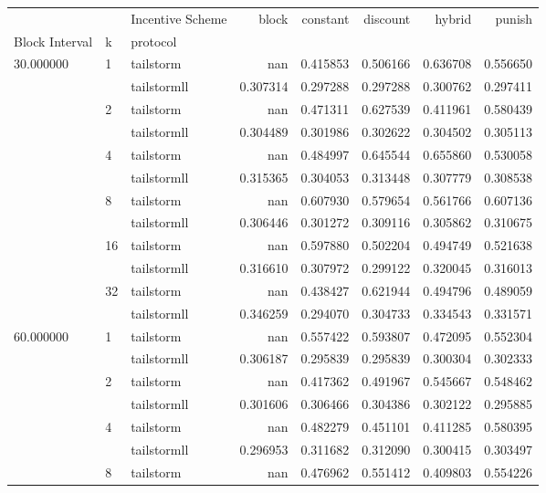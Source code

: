 \begin{tabular}{lllrrrrr}
 &  & Incentive Scheme & block & constant & discount & hybrid & punish \\
Block Interval & k & protocol &  &  &  &  &  \\
\multirow[c]{12}{*}{30.000000} & \multirow[c]{2}{*}{1} & tailstorm & nan & 0.415853 & 0.506166 & 0.636708 & 0.556650 \\
 &  & tailstormll & 0.307314 & 0.297288 & 0.297288 & 0.300762 & 0.297411 \\
 & \multirow[c]{2}{*}{2} & tailstorm & nan & 0.471311 & 0.627539 & 0.411961 & 0.580439 \\
 &  & tailstormll & 0.304489 & 0.301986 & 0.302622 & 0.304502 & 0.305113 \\
 & \multirow[c]{2}{*}{4} & tailstorm & nan & 0.484997 & 0.645544 & 0.655860 & 0.530058 \\
 &  & tailstormll & 0.315365 & 0.304053 & 0.313448 & 0.307779 & 0.308538 \\
 & \multirow[c]{2}{*}{8} & tailstorm & nan & 0.607930 & 0.579654 & 0.561766 & 0.607136 \\
 &  & tailstormll & 0.306446 & 0.301272 & 0.309116 & 0.305862 & 0.310675 \\
 & \multirow[c]{2}{*}{16} & tailstorm & nan & 0.597880 & 0.502204 & 0.494749 & 0.521638 \\
 &  & tailstormll & 0.316610 & 0.307972 & 0.299122 & 0.320045 & 0.316013 \\
 & \multirow[c]{2}{*}{32} & tailstorm & nan & 0.438427 & 0.621944 & 0.494796 & 0.489059 \\
 &  & tailstormll & 0.346259 & 0.294070 & 0.304733 & 0.334543 & 0.331571 \\
\multirow[c]{12}{*}{60.000000} & \multirow[c]{2}{*}{1} & tailstorm & nan & 0.557422 & 0.593807 & 0.472095 & 0.552304 \\
 &  & tailstormll & 0.306187 & 0.295839 & 0.295839 & 0.300304 & 0.302333 \\
 & \multirow[c]{2}{*}{2} & tailstorm & nan & 0.417362 & 0.491967 & 0.545667 & 0.548462 \\
 &  & tailstormll & 0.301606 & 0.306466 & 0.304386 & 0.302122 & 0.295885 \\
 & \multirow[c]{2}{*}{4} & tailstorm & nan & 0.482279 & 0.451101 & 0.411285 & 0.580395 \\
 &  & tailstormll & 0.296953 & 0.311682 & 0.312090 & 0.300415 & 0.303497 \\
 & \multirow[c]{2}{*}{8} & tailstorm & nan & 0.476962 & 0.551412 & 0.409803 & 0.554226 \\

\end{tabular}
